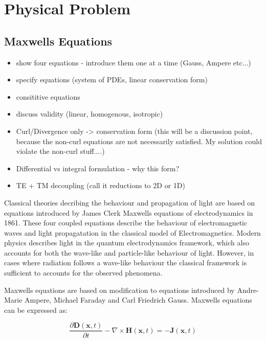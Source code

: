 \chapter{Physical Problem} %
\label{PhysicalProblemChapter}

\section{Maxwells Equations}

\begin{itemize}
  \item show four equations - introduce them one at a time (Gauss, Ampere etc...)
	\item specify equations (system of PDEs, linear conservation form)
  \item consititive equations
  \item discuss validity (linear, homogenous, isotropic)
	\item Curl/Divergence only -> conservation form (this will be a discussion point, because the non-curl equations are not necessarily satisfied. My solution could violate the non-curl stuff....)
	\item Differential vs integral formulation - why this form?
  \item TE + TM decoupling (call it reductions to 2D or 1D)
\end{itemize}

Classical theories decribing the behaviour and propagation of light are based on equations introduced by James Clerk Maxwells equations of electrodynamics in 1861. These four coupled equations describe the behaviour of electromagnetic waves and light propagatation in the classical model of Electromagnetics. Modern physics describes light in the quantum electrodynamics framework, which also accounts for both the wave-like and particle-like behaviour of light. However, in cases where radiation follows a wave-like behaviour the classical framework is sufficient to accounts for the observed phenomena.

Maxwells equations are based on modification to equations introduced by Andre-Marie Ampere, Michael Faraday and Carl Friedrich Gauss. Maxwells equations can be expressed as:

\begin{equation}
\frac{\partial \mathbf{D}(\mathbf{x}, t)}{\partial t} - \nabla \times \mathbf{H}(\mathbf{x},t) = - \mathbf{J}(\mathbf{x},t)
\label{maxwell-ampere}  
\end{equation}

